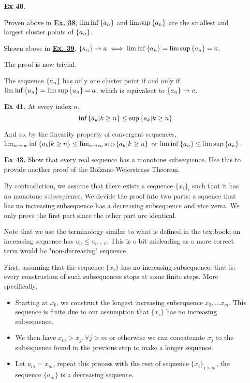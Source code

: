 \noindent \textbf{Ex 40.}

Proven above in \underline{\textbf{Ex. 38}}, $\liminf\left\{a_n\right\}$ and $\limsup\left\{a_n\right\}$ are the smallest and largest cluster points of $\left\{a_n\right\}$.

Shown above in \underline{\textbf{Ex. 39}}, $\left\{a_n\right\}\to a \iff \liminf\left\{a_n\right\} = \limsup\left\{a_n\right\} = a$.

The proof is now trivial.

The sequence $\left\{a_n\right\}$ has only one cluster point if and only if $\liminf\left\{a_n\right\} = \limsup\left\{a_n\right\} = a$, which is equivalent to $\left\{a_n\right\} \to a$.

\noindent \textbf{Ex 41.}
At every index $n$,
\[ \inf\left\{a_k | k \geq n\right\} \leq \sup\left\{a_k | k \geq n\right\} \]

And so, by the linearity property of convergent sequences, $\lim_{n\to\infty}\inf\left\{a_k | k \geq n\right\} \leq \lim_{n\to\infty}\sup\left\{a_k | k \geq n\right\}$ or $\liminf\left\{a_n\right\} \leq \limsup\left\{a_n\right\}$.

\noindent \textbf{Ex 43.} \label{ex:43} Show that every real sequence has a monotone subsequence. Use this to provide another proof of the Bolzano-Weierstrass Theorem. 

By contradiction, we assume that there exists a sequence $\{x_i\}_i$ such that it has no monotone subsequence. We devide the proof into two parts: a squence that has no increasing subsequence has a decreasing subsequence and vice versa. We only prove the first part since the other part are identical.

Note that we use the terminology similar to what is defined in the textbook: an increasing sequence has $a_n \leq a_{n+1}$. This is a bit misleading as a more correct term would be "non-decreasing" sequence. 

First, assuming that the sequence $\{x_i\}$ has no increasing subsequence; that is: every construstion of such subsequences stops at some finite steps. More specifically, 

\begin{itemize}
    \item Starting at $x_0$, we construct the longest increasing subsequence ${x_0, \dots x_m}$. This sequence is finite due to our assumption that $\{x_i\}$ has no increasing subsequence. 
    \item We then have $x_m>x_j, \forall j > m$ or otherwise we can concatenate $x_j$ to the subsequence found in the previous step to make a longer sequence.
    \item Let $a_m = x_m$, repeat this process with the rest of sequence $\{x_i\}_{i>m}$, the sequence $\{a_m\}$ is a decreasing sequence. 
\end{itemize}

